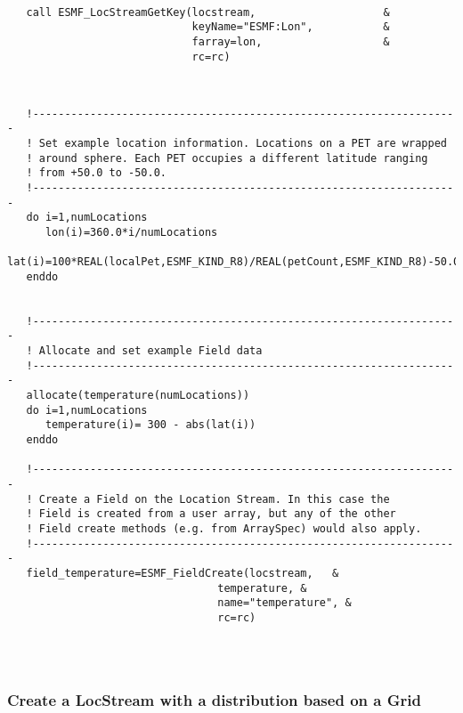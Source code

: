 
 \begin{verbatim}

   call ESMF_LocStreamGetKey(locstream,                    &
                             keyName="ESMF:Lon",           &
                             farray=lon,                   &
                             rc=rc)
 
\end{verbatim}
 

 \begin{verbatim}

   !-------------------------------------------------------------------
   ! Set example location information. Locations on a PET are wrapped 
   ! around sphere. Each PET occupies a different latitude ranging 
   ! from +50.0 to -50.0.
   !-------------------------------------------------------------------
   do i=1,numLocations
      lon(i)=360.0*i/numLocations
      lat(i)=100*REAL(localPet,ESMF_KIND_R8)/REAL(petCount,ESMF_KIND_R8)-50.0
   enddo


   !-------------------------------------------------------------------
   ! Allocate and set example Field data
   !-------------------------------------------------------------------
   allocate(temperature(numLocations))
   do i=1,numLocations
      temperature(i)= 300 - abs(lat(i))
   enddo

   !-------------------------------------------------------------------
   ! Create a Field on the Location Stream. In this case the 
   ! Field is created from a user array, but any of the other
   ! Field create methods (e.g. from ArraySpec) would also apply.
   !-------------------------------------------------------------------    
   field_temperature=ESMF_FieldCreate(locstream,   &
                                 temperature, &
                                 name="temperature", &
                                 rc=rc)


 
\end{verbatim}
 

  \subsubsection{Create a LocStream with a distribution based on a Grid}
  
